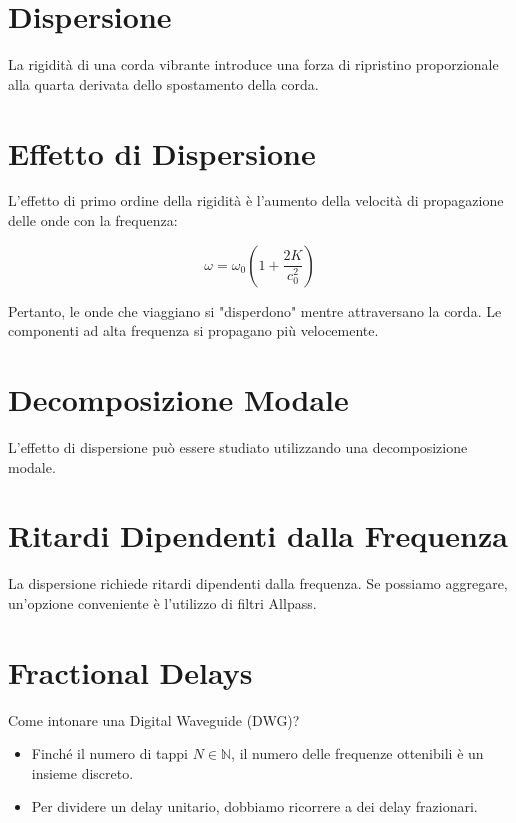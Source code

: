 \section{Dispersione}

La rigidità di una corda vibrante introduce una forza di ripristino proporzionale alla quarta derivata dello spostamento della corda.

\section{Effetto di Dispersione}

L'effetto di primo ordine della rigidità è l'aumento della velocità di propagazione delle onde con la frequenza:

\[
\omega = \omega_0 \left( 1 + \frac{2K}{c_0^2} \right)
\]

Pertanto, le onde che viaggiano si "disperdono" mentre attraversano la corda. Le componenti ad alta frequenza si propagano più velocemente.

\section{Decomposizione Modale}

L'effetto di dispersione può essere studiato utilizzando una decomposizione modale.

\section{Ritardi Dipendenti dalla Frequenza}

La dispersione richiede ritardi dipendenti dalla frequenza. Se possiamo aggregare, un'opzione conveniente è l'utilizzo di filtri Allpass.

\section{Fractional Delays}

Come intonare una Digital Waveguide (DWG)?

\begin{itemize}
    \item Finché il numero di tappi \( N \in \mathbb{N} \), il numero delle frequenze ottenibili è un insieme discreto.
    \item Per dividere un delay unitario, dobbiamo ricorrere a dei delay frazionari.
\end{itemize}

